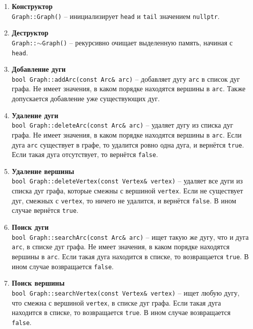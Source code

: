 \begin{enumerate}
    \item \textbf{Конструктор} \\
    \texttt{Graph::Graph()} -- инициализирует \texttt{head} и \texttt{tail} значением \texttt{nullptr}.
    
    \item \textbf{Деструктор} \\
    \texttt{Graph::$\sim$Graph()} -- рекурсивно очищает выделенную память, начиная с \texttt{head}.
    
    \item \textbf{Добавление дуги} \\
    \texttt{bool Graph::addArc(const Arc\& arc)} -- добавляет дугу \texttt{arc} в список дуг графа. Не имеет значения, в каком порядке находятся вершины в \texttt{arc}. Также допускается добавление уже существующих дуг.
    
    \item \textbf{Удаление дуги} \\
    \texttt{bool Graph::deleteArc(const Arc\& arc)} -- удаляет дугу  из списка дуг графа. Не имеет значения, в каком порядке находятся вершины в \texttt{arc}. Если дуга \texttt{arc} существует в графе, то удалится ровно одна дуга, и вернётся \texttt{true}. Если такая дуга отсутствует, то вернётся \texttt{false}.
    
    \item \textbf{Удаление вершины} \\
    \texttt{bool Graph::deleteVertex(const Vertex\& vertex)} -- удаляет все дуги из списка дуг графа, которые смежны с вершиной \texttt{vertex}. Если не существует дуг, смежных с \texttt{vertex}, то ничего не удалится, и вернётся \texttt{false}. В ином случае вернётся \texttt{true}.

    \item \textbf{Поиск дуги} \\
    \texttt{bool Graph::searchArc(const Arc\& arc)} -- ищет такую же дугу, что и дуга \texttt{arc}, в списке дуг графа. Не имеет значения, в каком порядке находятся вершины в \texttt{arc}. Если такая дуга находится в списке, то возвращается \texttt{true}. В ином случае возвращается \texttt{false}.

    \item \textbf{Поиск вершины} \\
    \texttt{bool Graph::searchVertex(const Vertex\& vertex)} -- ищет любую дугу, что смежна с вершиной \texttt{vertex}, в списке дуг графа. Если такая дуга находится в списке, то возвращается \texttt{true}. В ином случае возвращается \texttt{false}.
    

\end{enumerate}
